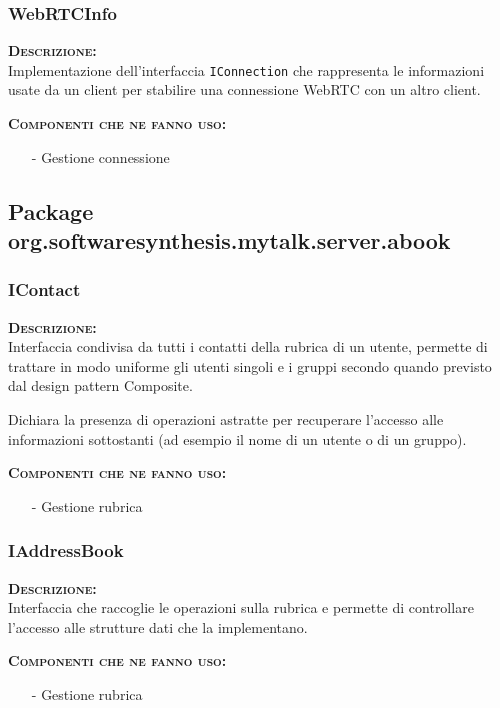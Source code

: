 \subsubsection{WebRTCInfo}
\begin{description}
	\item{\scshape\bfseries Descrizione:}\\
Implementazione dell'interfaccia \texttt{IConnection} che rappresenta le informazioni usate da un client per stabilire una connessione WebRTC con un altro client.
	\item{\scshape\bfseries Componenti che ne fanno uso:}
		\begin{itemize}[noitemsep,nolistsep]
			\item[-] Gestione connessione
		\end{itemize}
\end{description}

\subsection{Package org.softwaresynthesis.mytalk.server.abook}

\subsubsection{IContact}
\begin{description}
	\item{\scshape\bfseries Descrizione:}\\
Interfaccia condivisa da tutti i contatti della rubrica di un utente, permette di trattare in modo uniforme gli utenti singoli e i gruppi secondo quando previsto dal design pattern Composite.

Dichiara la presenza di operazioni astratte per recuperare l'accesso alle informazioni sottostanti (ad esempio il nome di un utente o di un gruppo).
	\item{\scshape\bfseries Componenti che ne fanno uso:}
	\begin{itemize}[nolistsep, noitemsep]
	  \item[-] Gestione rubrica
	\end{itemize}
\end{description}

\subsubsection{IAddressBook}
\begin{description}
	\item{\scshape\bfseries Descrizione:}\\
Interfaccia che raccoglie le operazioni sulla rubrica e permette di controllare l'accesso alle strutture dati che la implementano.
	\item{\scshape\bfseries Componenti che ne fanno uso:}
	\begin{itemize}[noitemsep,nolistsep]
	  \item[-] Gestione rubrica
	\end{itemize}
\end{description}

